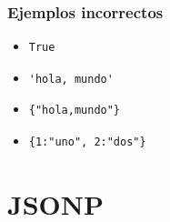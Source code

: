 \documentclass[ucs]{beamer}
\begin{document}
\begin{frame}[fragile]
\frametitle{Ejemplos incorrectos}
\begin{itemize}
\item
  \begin{footnotesize}
  \begin{verbatim}
True
  \end{verbatim}
  \end{footnotesize}
\item

  \begin{footnotesize}
  \begin{verbatim}
'hola, mundo'
  \end{verbatim}
  \end{footnotesize}

\item
  \begin{footnotesize}
  \begin{verbatim}
{"hola,mundo"}
  \end{verbatim}
  \end{footnotesize}

\item
  \begin{footnotesize}
  \begin{verbatim}
{1:"uno", 2:"dos"}
  \end{verbatim}
  \end{footnotesize}
\end{itemize}
\end{frame}




\section{JSONP}
\end{document}
